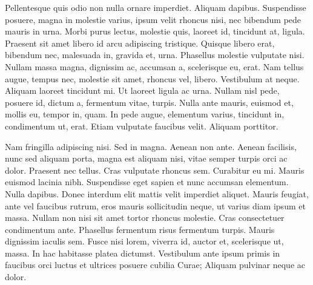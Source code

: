 Pellentesque quis odio non nulla ornare imperdiet. Aliquam
dapibus. Suspendisse posuere, magna in molestie varius, ipsum velit rhoncus
nisi, nec bibendum pede mauris in urna. Morbi purus lectus, molestie quis,
laoreet id, tincidunt at, ligula. 
Praesent sit amet libero id arcu
adipiscing tristique. Quisque libero erat, bibendum nec, malesuada in,
gravida et, urna. Phasellus molestie vulputate nisi. Nullam massa magna,
dignissim ac, accumsan a, scelerisque eu, erat. Nam tellus augue, tempus
nec, molestie sit amet, rhoncus vel, libero. Vestibulum at neque. Aliquam
laoreet tincidunt mi. Ut laoreet ligula ac urna. Nullam nisl pede, posuere
id, dictum a, fermentum vitae, turpis.  Nulla ante mauris, euismod et,
mollis eu, tempor in, quam. 
In pede augue, elementum varius, tincidunt in,
condimentum ut, erat. Etiam vulputate faucibus velit. Aliquam porttitor.

Nam fringilla adipiscing nisi. Sed in magna. Aenean non ante. Aenean
facilisis, nunc sed aliquam porta, magna est aliquam nisi, vitae semper
turpis orci ac dolor. Praesent nec tellus. Cras vulputate rhoncus sem.
Curabitur eu mi. Mauris euismod lacinia nibh. Suspendisse eget sapien et
nunc accumsan elementum.  Nulla dapibus. Donec interdum elit mattis velit
imperdiet aliquet. Mauris feugiat, ante vel faucibus rutrum, eros mauris
sollicitudin neque, ut varius diam ipsum et massa. Nullam non nisi sit amet
tortor rhoncus molestie. Cras consectetuer condimentum ante. Phasellus
fermentum risus fermentum turpis. Mauris dignissim iaculis sem. Fusce nisi
lorem, viverra id, auctor et, scelerisque ut, massa. In hac habitasse
platea dictumst. Vestibulum ante ipsum primis in faucibus orci luctus et
ultrices posuere cubilia Curae; Aliquam pulvinar neque ac dolor.

